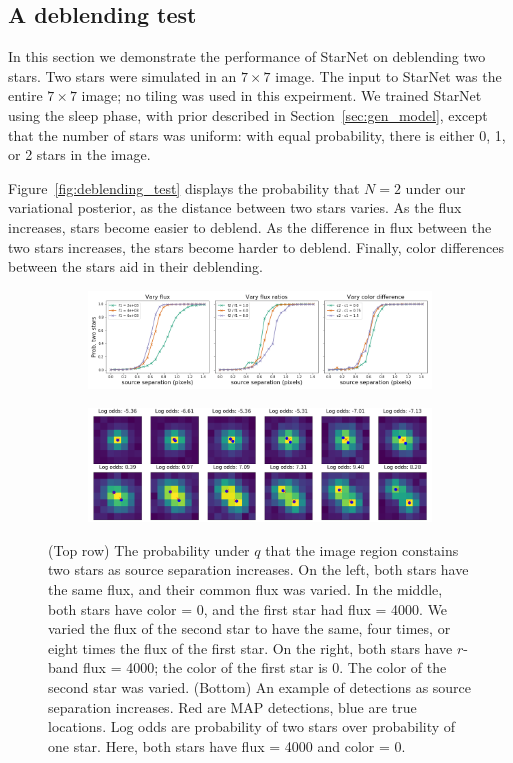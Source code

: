 \subsection{A deblending test}
\label{sec:deblending_test}

In this section we demonstrate the performance of StarNet on deblending two stars. Two stars were simulated in an $7\times 7$ image. The input to StarNet was the entire $7\times 7$ image; no tiling was used in this expeirment. 
We trained StarNet using the sleep phase, with prior described in Section~\ref{sec:gen_model}, except that the number of stars was uniform: with equal probability, there is either 0, 1, or 2 stars in the image. 

Figure~\ref{fig:deblending_test} displays the probability that $N = 2$ under our variational posterior, as the distance between two stars varies.
As the flux increases, stars become easier to deblend.
As the difference in flux between the two stars increases, the stars become harder to deblend. 
Finally, color differences between the stars aid in their deblending.

\begin{figure}[!h]
    \centering
    \begin{subfigure}{0.95\textwidth}
        \includegraphics[width=\textwidth]{figures/deblending_test.png}
    \end{subfigure}
      \begin{subfigure}{0.95\textwidth}
        \includegraphics[width=\textwidth]{figures/deblending_ex_test.png}
    \end{subfigure}
    \label{fig:deblending_test}
    \caption{(Top row) The probability under $q$ that the image region constains two stars as source separation increases.
    On the left, both stars have the same flux, and their common flux was varied. In the middle, both stars have color = 0, and the first star had flux = 4000. We varied the flux of the second star to have the same, four times, or eight times the flux of the first star. On the right, both stars have $r$-band flux = 4000; the color of the first star is 0. The color of the second star was varied.
    (Bottom) An example of detections as source separation increases. Red are MAP detections, blue are true locations. Log odds are probability of two stars over probability of one star. Here, both stars have flux = 4000 and color = 0.}
    \label{fig:sparse_field}
\end{figure}
